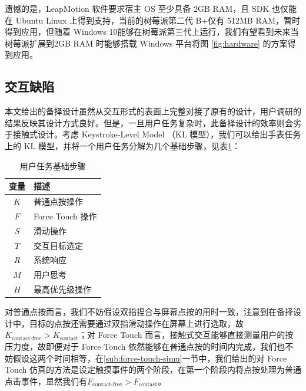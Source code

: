 遗憾的是，LeapMotion 软件要求宿主 OS 至少具备 2GB RAM，且 SDK 也仅能在 Ubuntu Linux 上得到支持，当前的树莓派第二代 B+仅有 512MB RAM，暂时得到应用，但随着 Windows 10能够在树莓派第三代上运行，我们有望看到未来当树莓派扩展到2GB RAM 时能够搭载 Windows 平台将图 \ref{fig:hardware} 的方案得到应用。

\subsection{交互缺陷}

本文给出的备择设计虽然从交互形式的表面上完整对接了原有的设计，用户调研的结果反映其设计方式良好。但是，一旦用户任务复杂时，此备择设计的效率则会劣于接触式设计。考虑 Keystroke-Level Model （KL 模型）\cite{Card:1980:KMU:358886.358895}，我们可以给出手表任务上的 KL 模型，并将一个用户任务分解为几个基础步骤，见表\ref{table:task}：

\begin{table}[H]
    \small
    \kaishu
    \centering
    \setlength{\belowcaptionskip}{10pt}
    \caption{用户任务基础步骤}

    \begin{tabular}{c l}
        \toprule
        \textbf{变量}        & \textbf{描述} \\
        \hline
        $K$     & 普通点按操作 \\
        $F$     & Force Touch 操作 \\
        $S$     & 滑动操作 \\
        $T$     & 交互目标选定 \\
        $R$     & 系统响应 \\
        $M$     & 用户思考 \\
        $H$     & 最高优先级操作 \\
        \bottomrule
    \end{tabular}

    \label{table:task}
\end{table}

对普通点按而言，我们不妨假设双指捏合与屏幕点按的用时一致，注意到在备择设计中，目标的点按还需要通过双指滑动操作在屏幕上进行选取，故$K_{\text{contact-free}}>K_{\text{contact}}$；对 Force Touch 而言，接触式交互能够直接测量用户的按压力度，故即便对于 Force Touch 依然能够在普通点按的时间内完成，我们也不妨假设这两个时间相等，在\ref{sub:force-touch-simu}一节中，我们给出的对 Force Touch 仿真的方法是设定触摸事件的两个阶段，在第一个阶段内将点按处理为普通点击事件，显然我们有$F_{\text{contact-free}}>F_{\text{contact}}$。

